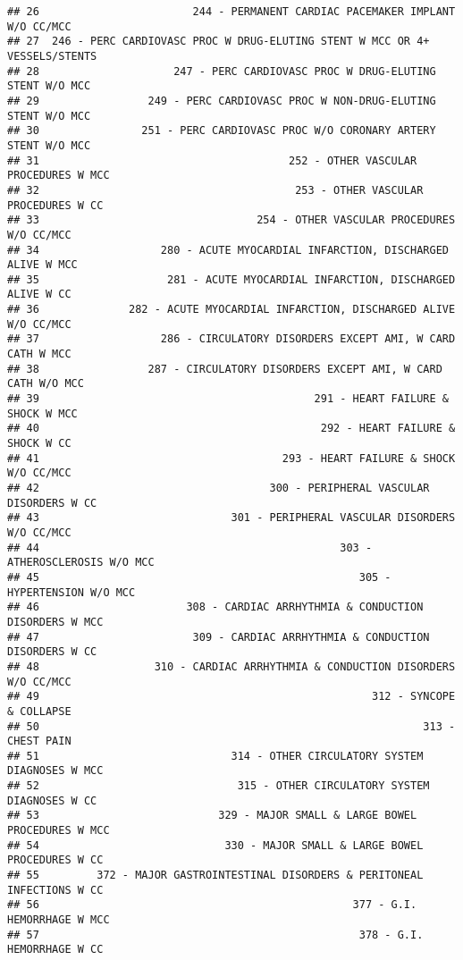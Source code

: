 \documentclass[]{article}
\begin{document}
\begin{verbatim}
## 26                        244 - PERMANENT CARDIAC PACEMAKER IMPLANT W/O CC/MCC
## 27  246 - PERC CARDIOVASC PROC W DRUG-ELUTING STENT W MCC OR 4+ VESSELS/STENTS
## 28                     247 - PERC CARDIOVASC PROC W DRUG-ELUTING STENT W/O MCC
## 29                 249 - PERC CARDIOVASC PROC W NON-DRUG-ELUTING STENT W/O MCC
## 30                251 - PERC CARDIOVASC PROC W/O CORONARY ARTERY STENT W/O MCC
## 31                                       252 - OTHER VASCULAR PROCEDURES W MCC
## 32                                        253 - OTHER VASCULAR PROCEDURES W CC
## 33                                  254 - OTHER VASCULAR PROCEDURES W/O CC/MCC
## 34                   280 - ACUTE MYOCARDIAL INFARCTION, DISCHARGED ALIVE W MCC
## 35                    281 - ACUTE MYOCARDIAL INFARCTION, DISCHARGED ALIVE W CC
## 36              282 - ACUTE MYOCARDIAL INFARCTION, DISCHARGED ALIVE W/O CC/MCC
## 37                   286 - CIRCULATORY DISORDERS EXCEPT AMI, W CARD CATH W MCC
## 38                 287 - CIRCULATORY DISORDERS EXCEPT AMI, W CARD CATH W/O MCC
## 39                                           291 - HEART FAILURE & SHOCK W MCC
## 40                                            292 - HEART FAILURE & SHOCK W CC
## 41                                      293 - HEART FAILURE & SHOCK W/O CC/MCC
## 42                                    300 - PERIPHERAL VASCULAR DISORDERS W CC
## 43                              301 - PERIPHERAL VASCULAR DISORDERS W/O CC/MCC
## 44                                               303 - ATHEROSCLEROSIS W/O MCC
## 45                                                  305 - HYPERTENSION W/O MCC
## 46                       308 - CARDIAC ARRHYTHMIA & CONDUCTION DISORDERS W MCC
## 47                        309 - CARDIAC ARRHYTHMIA & CONDUCTION DISORDERS W CC
## 48                  310 - CARDIAC ARRHYTHMIA & CONDUCTION DISORDERS W/O CC/MCC
## 49                                                    312 - SYNCOPE & COLLAPSE
## 50                                                            313 - CHEST PAIN
## 51                              314 - OTHER CIRCULATORY SYSTEM DIAGNOSES W MCC
## 52                               315 - OTHER CIRCULATORY SYSTEM DIAGNOSES W CC
## 53                            329 - MAJOR SMALL & LARGE BOWEL PROCEDURES W MCC
## 54                             330 - MAJOR SMALL & LARGE BOWEL PROCEDURES W CC
## 55         372 - MAJOR GASTROINTESTINAL DISORDERS & PERITONEAL INFECTIONS W CC
## 56                                                 377 - G.I. HEMORRHAGE W MCC
## 57                                                  378 - G.I. HEMORRHAGE W CC

\end{verbatim}
\end{document}
